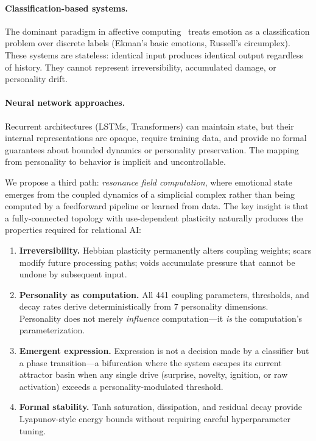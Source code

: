 \documentclass[11pt]{article}
\begin{document}
\paragraph{Classification-based systems.} The dominant paradigm in affective computing~\cite{picard1997} treats emotion as a classification problem over discrete labels (Ekman's basic emotions, Russell's circumplex). These systems are stateless: identical input produces identical output regardless of history. They cannot represent irreversibility, accumulated damage, or personality drift.

\paragraph{Neural network approaches.} Recurrent architectures (LSTMs, Transformers) can maintain state, but their internal representations are opaque, require training data, and provide no formal guarantees about bounded dynamics or personality preservation. The mapping from personality to behavior is implicit and uncontrollable.

We propose a third path: \emph{resonance field computation}, where emotional state emerges from the coupled dynamics of a simplicial complex rather than being computed by a feedforward pipeline or learned from data. The key insight is that a fully-connected topology with use-dependent plasticity naturally produces the properties required for relational AI:

\begin{enumerate}[leftmargin=*]
\item \textbf{Irreversibility.} Hebbian plasticity permanently alters coupling weights; scars modify future processing paths; voids accumulate pressure that cannot be undone by subsequent input.
\item \textbf{Personality as computation.} All 441 coupling parameters, thresholds, and decay rates derive deterministically from 7 personality dimensions. Personality does not merely \emph{influence} computation---it \emph{is} the computation's parameterization.
\item \textbf{Emergent expression.} Expression is not a decision made by a classifier but a phase transition---a bifurcation where the system escapes its current attractor basin when any single drive (surprise, novelty, ignition, or raw activation) exceeds a personality-modulated threshold.
\item \textbf{Formal stability.} Tanh saturation, dissipation, and residual decay provide Lyapunov-style energy bounds without requiring careful hyperparameter tuning.
\end{enumerate}
\end{document}
